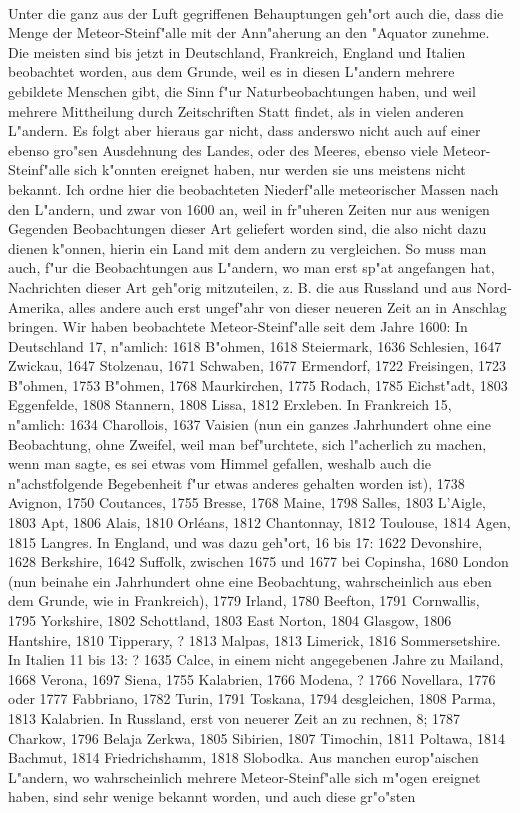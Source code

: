 \documentclass[a4paper, 11pt, oneside, polutonikogreek, german]{article}
\begin{document}
\paragraph{}
Unter die ganz aus der Luft gegriffenen Behauptungen geh"ort auch die, dass die Menge der Meteor-Steinf"alle mit der Ann"aherung an den "Aquator zunehme. Die meisten sind bis jetzt in Deutschland, Frankreich, England und Italien beobachtet worden, aus dem Grunde, weil es in diesen L"andern mehrere gebildete Menschen gibt, die Sinn f"ur Naturbeobachtungen haben, und weil mehrere Mittheilung durch Zeitschriften Statt findet, als in vielen anderen L"andern. Es folgt aber hieraus gar nicht, dass anderswo nicht auch auf einer ebenso gro"sen Ausdehnung des Landes, oder des Meeres, ebenso viele Meteor-Steinf"alle sich k"onnten ereignet haben, nur werden sie uns meistens nicht bekannt. Ich ordne hier die beobachteten Niederf"alle meteorischer Massen nach den L"andern, und zwar von 1600 an, weil in fr"uheren Zeiten nur aus wenigen Gegenden Beobachtungen dieser Art geliefert worden sind, die also nicht dazu dienen k"onnen, hierin ein Land mit dem andern zu vergleichen. So muss man auch, f"ur die Beobachtungen aus L"andern, wo man erst sp"at angefangen hat, Nachrichten dieser Art geh"orig mitzuteilen, z. B. die aus Russland und aus Nord-Amerika, alles andere auch erst ungef"ahr von dieser neueren Zeit an in Anschlag bringen. Wir haben beobachtete Meteor-Steinf"alle seit dem Jahre 1600: In Deutschland 17, n"amlich: 1618 B"ohmen, 1618 Steiermark, 1636 Schlesien, 1647 Zwickau, 1647 Stolzenau, 1671 Schwaben, 1677 Ermendorf, 1722 Freisingen, 1723 B"ohmen, 1753 B"ohmen, 1768 Maurkirchen, 1775 Rodach, 1785 Eichst"adt, 1803 Eggenfelde, 1808 Stannern, 1808 Lissa, 1812 Erxleben. In Frankreich 15, n"amlich: 1634 Charollois, 1637 Vaisien (nun ein ganzes Jahrhundert ohne eine Beobachtung, ohne Zweifel, weil man bef"urchtete, sich l"acherlich zu machen, wenn man sagte, es sei etwas vom Himmel gefallen, weshalb auch die n"achstfolgende Begebenheit f"ur etwas anderes gehalten worden ist), 1738 Avignon, 1750 Coutances, 1755 Bresse, 1768 Maine, 1798 Salles, 1803 L'Aigle, 1803 Apt, 1806 Alais, 1810 Orléans, 1812 Chantonnay, 1812 Toulouse, 1814 Agen, 1815 Langres. In England, und was dazu geh"ort, 16 bis 17: 1622 Devonshire, 1628 Berkshire, 1642 Suffolk, zwischen 1675 und 1677 bei Copinsha, 1680 London (nun beinahe ein Jahrhundert ohne eine Beobachtung, wahrscheinlich aus eben dem Grunde, wie in Frankreich), 1779 Irland, 1780 Beefton, 1791 Cornwallis, 1795 Yorkshire, 1802 Schottland, 1803 East Norton, 1804 Glasgow, 1806 Hantshire, 1810 Tipperary, ? 1813 Malpas, 1813 Limerick, 1816 Sommersetshire. In Italien 11 bis 13: ? 1635 Calce, in einem nicht angegebenen Jahre zu Mailand, 1668 Verona, 1697 Siena, 1755 Kalabrien, 1766 Modena, ? 1766 Novellara, 1776 oder 1777 Fabbriano, 1782 Turin, 1791 Toskana, 1794 desgleichen, 1808 Parma, 1813 Kalabrien. In Russland, erst von neuerer Zeit an zu rechnen, 8; 1787 Charkow, 1796 Belaja Zerkwa, 1805 Sibirien, 1807 Timochin, 1811 Poltawa, 1814 Bachmut, 1814 Friedrichshamm, 1818 Slobodka. Aus manchen europ"aischen L"andern, wo wahrscheinlich mehrere Meteor-Steinf"alle sich m"ogen ereignet haben, sind sehr wenige bekannt worden, und auch diese gr"o"sten 
\end{document}
